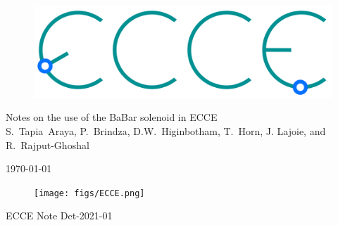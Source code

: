 \renewcommand*\familydefault{\sfdefault}
{\sffamily
\vfill
\vspace{4cm}
\begin{figure}[H]
  \begin{center}
  \includegraphics[width=0.3\linewidth]{figs/ecce-logo.png}
\end{center}
\end{figure}

\vspace{2mm}

\begin{center}
  \large
{\LARGE{Notes on the use of the BaBar solenoid in ECCE}} \\
\vspace{0.25cm}
S.~Tapia~Araya, P.~Brindza, D.W.~Higinbotham, T.~Horn, J. Lajoie, and R.~Rajput-Ghoshal

\vspace{0.25cm}
\today
\\
%
%
\end{center}

\vfill
\begin{figure}[H]
  \begin{center}
    \texttt{[image: figs/ECCE.png]}
  \end{center}
\end{figure}
}
\vspace{2.5cm}

\begin{center}
{\LARGE{ECCE Note Det-2021-01}} \\
\vspace{2mm}
\end{center}
\renewcommand*\familydefault{\rmdefault}

